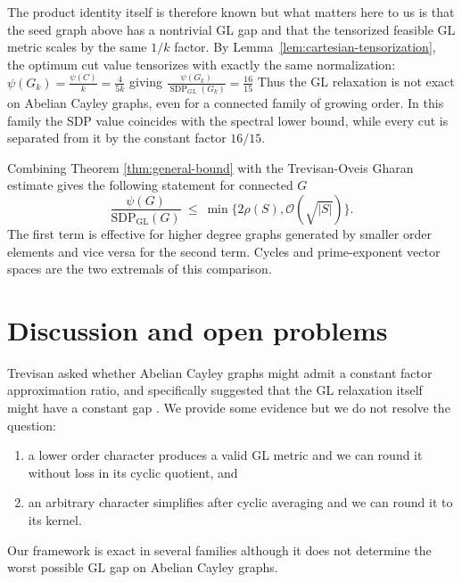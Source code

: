 \documentclass[11pt]{article}
\theoremstyle{definition}
\theoremstyle{remark}
\newcommand{\gl}{\operatorname{SDP_{GL}}}
\begin{document}
The product identity itself is therefore known but what matters here to us is that the seed graph above has a nontrivial GL gap and that the tensorized feasible GL metric scales by the same $1/k$ factor.
By Lemma~\ref{lem:cartesian-tensorization}, the optimum cut value
tensorizes with exactly the same normalization: $\psi(G_k) = \frac{\psi(C)}{k} = \frac{4}{5k}$ giving $\frac{\psi(G_k)}{\operatorname{SDP}_{GL}(G_k)} = \frac{16}{15}$
Thus the GL relaxation is not exact on Abelian Cayley graphs, even
for a connected family of growing order. In this family the SDP value
coincides with the spectral lower bound, while every cut is separated
from it by the constant factor $16/15$.






Combining Theorem \ref{thm:general-bound} with the Trevisan-Oveis Gharan estimate gives the following statement for connected $G$
\begin{equation}\label{eq:combined-picture}
  \frac{\psi(G)}{\gl(G)}
  ~\leq~ \min \Big\{2\rho(S), \mathcal{O} (\sqrt{|S|})\Big\}.
\end{equation}
The first term  is effective for higher degree graphs generated by smaller order elements and vice versa for the second term. Cycles and prime-exponent vector spaces are the two extremals of this comparison.



\section{Discussion and open problems}\label{sec:discussion}
Trevisan asked whether Abelian Cayley graphs might admit a constant factor approximation ratio, and specifically suggested that the GL relaxation itself might have a constant gap \cite{Trevisan21}. We provide some evidence but we do not resolve the question:
\begin{enumerate}
  \item a lower order character produces a valid GL metric and we can  round it without loss in its cyclic quotient, and
  \item an arbitrary character simplifies  after cyclic averaging and we can  round it to its kernel.
\end{enumerate}
Our framework is exact in several families although it does not determine the worst possible GL gap on Abelian Cayley graphs.
\end{document}

